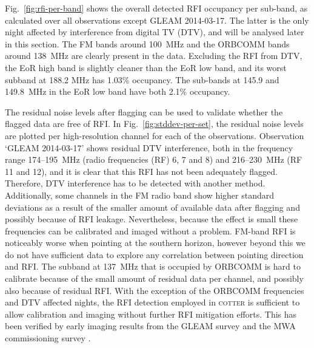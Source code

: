 \documentclass{pasa}
\begin{document}
Fig.~\ref{fig:rfi-per-band} shows the overall detected RFI occupancy per sub-band, as calculated over all observations except GLEAM 2014-03-17. The latter is the only night affected by interference from digital TV (DTV), and will be analysed later in this section. The FM bands around 100~MHz and the ORBCOMM bands around 138~MHz are clearly present in the data. Excluding the RFI from DTV, the EoR high band is slightly cleaner than the EoR low band, and its worst subband at 188.2 MHz has 1.03\% occupancy. The sub-bands at 145.9 and 149.8~MHz in the EoR low band have both 2.1\% occupancy.

The residual noise levels after flagging can be used to validate whether the flagged data are free of RFI. In Fig.~\ref{fig:stddev-per-set}, the residual noise levels are plotted per high-resolution channel for each of the observations. Observation `GLEAM 2014-03-17' shows residual DTV interference, both in the frequency range 174--195~MHz (radio frequencies (RF) 6, 7 and 8) and 216--230~MHz (RF 11 and 12), and it is clear that this RFI has not been adequately flagged. Therefore, DTV interference has to be detected with another method. Additionally, some channels in the FM radio band show higher standard deviations as a result of the smaller amount of available data after flagging and possibly because of RFI leakage. Nevertheless, because the effect is small these frequencies can be calibrated and imaged without a problem. FM-band RFI is noticeably worse when pointing at the southern horizon, however beyond this we do not have sufficient data to explore any correlation between pointing direction and RFI. The subband at 137~MHz that is occupied by ORBCOMM is hard to calibrate because of the small amount of residual data per channel, and possibly also because of residual RFI. With the exception of the ORBCOMM frequencies and DTV affected nights, the RFI detection employed in \textsc{cotter} is sufficient to allow calibration and imaging without further RFI mitigation efforts. This has been verified by early imaging results from the GLEAM survey and the MWA commissioning survey \citep{hindson-cluster-emission-2014, hurley-walker-mwacs-2014, murphy-mwa-exoplanets-2014}.
\end{document}
